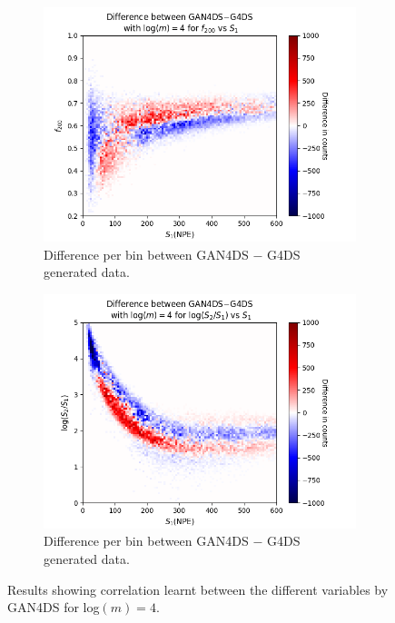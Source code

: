 \documentclass[11pt]{article} %
\begin{document}
\begin{figure}[H]
\begin{minipage}{\textwidth}
\end{minipage}
\begin{minipage}{\textwidth}
  \begin{subfigure}{.5\textwidth}
      \centering\captionsetup{width=.8\linewidth}%
      \includegraphics[scale=0.5]{./images/4/difference_f200_vs_s1.png}
      \caption{Difference per bin between GAN4DS $-$ G4DS generated data.}
  \end{subfigure}
  \begin{subfigure}{.5\textwidth}
      \centering\captionsetup{width=.8\linewidth}%
      \includegraphics[scale=0.5]{./images/4/difference_s1_over_s2_vs_s1.png}
      \caption{Difference per bin between GAN4DS $-$ G4DS generated data.}
  \end{subfigure}
\end{minipage}
\caption{Results showing correlation learnt between the different variables by GAN4DS for log$(m)=4$.}
\label{fig:corr_results_4}
\end{figure}
\end{document}
